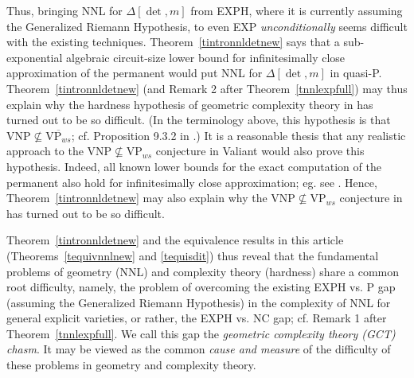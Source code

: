 \documentclass[11pt]{article}
\begin{document}
Thus,  bringing  NNL for $\Delta[\det,m]$  from EXPH,
where it is currently assuming the Generalized Riemann Hypothesis, 
to  even EXP {\em unconditionally}  seems difficult with the existing techniques.
Theorem~\ref{tintronnldetnew} says that 
a sub-exponential algebraic  circuit-size lower bound for infinitesimally 
close approximation of the permanent would put NNL for $\Delta[\det,m]$  in  quasi-P.
Theorem~\ref{tintronnldetnew} (and Remark 2 after Theorem~\ref{tnnlexpfull}) 
 may thus explain why  the hardness hypothesis of  geometric complexity theory in \cite{GCT1} 
has turned out to be so difficult. 
(In the terminology above, this
hypothesis  is that $\mbox{VNP} \not \subseteq \overline {\mbox{VP}_{ws}}$; cf. Proposition 9.3.2 in \cite{manivel}.)
It is a reasonable thesis that any realistic approach to the 
$\mbox{VNP} \not \subseteq {\mbox{VP}_{ws}}$  conjecture in Valiant \cite{valiant2}
would also prove  this hypothesis. 
Indeed, 
all known lower bounds for the exact computation of the permanent
also hold for infinitesimally close approximation; eg. see
\cite{ressayre2,GrochowGCTUnifies}.
Hence, Theorem~\ref{tintronnldetnew} may  also explain why the
$\mbox{VNP} \not \subseteq {\mbox{VP}_{ws}}$  conjecture  in
\cite{valiant2} has turned out to be so difficult.


Theorem~\ref{tintronnldetnew} and the equivalence results  in this article (Theorems~\ref{tequivnnlnew} and \ref{tequisdit})
thus reveal that the fundamental  problems of geometry (NNL) and complexity theory 
(hardness) share a common root difficulty, 
namely,  the problem of overcoming the existing   EXPH vs. P gap (assuming the Generalized Riemann Hypothesis)  in the  complexity of NNL
for general explicit varieties,
or rather, the  EXPH vs. NC gap; cf. Remark 1 after Theorem~\ref{tnnlexpfull}.
We call this gap  the {\em geometric complexity theory (GCT) chasm}.
It may be viewed as the common {\em cause and measure}  of the difficulty of these  problems in geometry and complexity theory.
\end{document}

